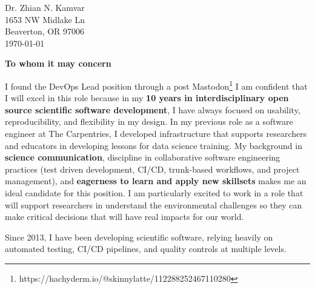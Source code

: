 


\clearpage
\begin{flushright}
  Dr. Zhian N. Kamvar\\
  1653 NW Midlake Ln\\
  Beaverton, OR 97006\\
  \today
\end{flushright}

\textbf{To whom it may concern}

\vspace{2ex}

I found the DevOps Lead position through a post Mastodon\footnote{https://hachyderm.io/@skinnylatte/112288252467110280} 
I am confident that I will excel in
this role because in my \textbf{10 years in interdisciplinary open source
scientific software development}, I have always focused on usability,
reproducibility, and flexibility in my design.
In my previous role as a software engineer at The Carpentries, I developed
infrastructure that supports researchers and educators in developing lessons
for data science training.
My background in \textbf{science communication}, discipline in collaborative
software engineering practices (test driven development, CI/CD, trunk-based
workflows, and project management), and \textbf{eagerness to learn and apply
new skillsets} makes me an ideal candidate for this position. 
I am particularly excited to work in a role that will support researchers in
understand the environmental challenges so they can make critical decisions
that will have real impacts for our world.



\vspace{2ex}

Since 2013, I have been developing scientific software, relying heavily on
automated testing, CI/CD pipelines, and quality controls at multiple levels.

\vspace{2ex}

